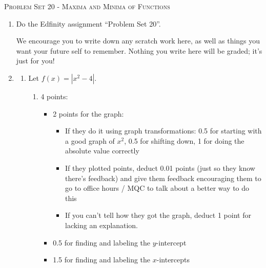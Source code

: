 \documentclass{article}
\newcommand{\doedfinity}[2][\newpage]{
  \begin{problem}[#1]
    Do the Edfinity assignment ``Problem Set #2''.

    We encourage you to write down any scratch work here, as well as
    things you want your future self to remember. Nothing you write
    here will be graded; it's just for you!
  \end{problem}
}
\begin{document}
\begin{center}
  \large\textsc{Problem Set 20 - Maxima and Minima of Functions}
\end{center}

\begin{enumerate}
\item  {}

  \doedfinity{20}

\item    
  \begin{enumerate}
  \item Let $f(x) = |x^2 - 4|$.

    \begin{enumerate}
    \item

      \begin{grading}
        4 points:
        \begin{itemize}[nosep]
        \item 2 points for the graph:
          \begin{itemize}[nosep]
          \item If they do it using graph transformations: 0.5 for starting with a good graph of $x^2$, 0.5 for shifting down, 1 for doing the absolute value correctly
          \item If they plotted points, deduct 0.01 points (just so they know there's feedback) and give them feedback encouraging them to go to office hours / MQC to talk about a better way to do this
          \item If you can't tell how they got the graph, deduct 1 point for lacking an explanation. 
          \end{itemize}
        \item 0.5 for finding and labeling the $y$-intercept
        \item 1.5 for finding and labeling the $x$-intercepts
        \end{itemize}
      \end{grading}


\end{enumerate}
\end{enumerate}
\end{enumerate}
\end{document}

